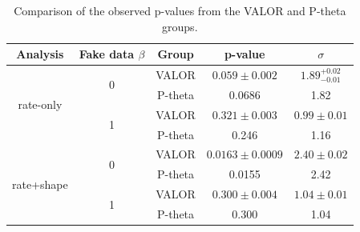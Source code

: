 \begin{table}[H]
\centering
\begin{tabular}{|c|c|c|c|c|}
	\hline
	Analysis                    & Fake data $\beta$   & Group                   & p-value              & $\sigma$                \\
	\hline
	
	
	\multirow{4}{*}{rate-only}  & \multirow{ 2}{*}{0} & VALOR                   & $0.059 \pm 0.002$    & $1.89^{+0.02}_{-0.01}$  \\
	\cline{3-5}
	                            &                     & P-theta                 & 0.0686               & 1.82                    \\
	\cline{2-5}
	                            & \multirow{ 2}{*}{1} & VALOR                   & $0.321 \pm 0.003$    & $0.99 \pm 0.01$         \\
	\cline{3-5}
	                            &                     & P-theta                 & 0.246                & 1.16                    \\
	\hline
	
	
	\multirow{4}{*}{rate+shape} & \multirow{ 2}{*}{0} & VALOR                   & $0.0163 \pm 0.0009$  & $2.40 \pm 0.02$         \\
	\cline{3-5}
	                            &                     & P-theta                 & 0.0155               & 2.42                    \\
	\cline{2-5}
	                            & \multirow{ 2}{*}{1} & VALOR                   & $0.300 \pm 0.004$    & $1.04 \pm 0.01$         \\
	\cline{3-5}
	                            &                     & P-theta                 & 0.300                & 1.04                    \\
	\hline
	
	
\end{tabular}
\caption{
	Comparison of the observed p-values from the VALOR and P-theta groups.
}
\label{tab:compare_pvals_data_valor_ptheta}
\end{table}

